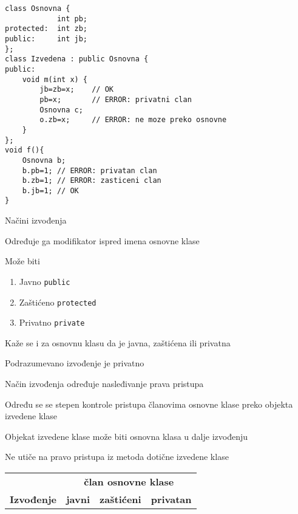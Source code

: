 \documentclass{article}
\newenvironment{xitemize}{%
    
    \itemize
    \larger
}{%
    \enditemize
}
\let\olditemize\itemize
\let\endolditemize\enditemize
\renewenvironment{itemize}{%
    \smaller
    \olditemize
}{%
    \endolditemize
}
\providecommand{\inlinecode}[1]{\texttt{#1}}
\begin{document}
\begin{xitemize}
\begin{itemize}
    \begin{lstlisting}
class Osnovna {
            int pb;
protected:  int zb;
public:     int jb;
};
class Izvedena : public Osnovna {
public:
    void m(int x) {
        jb=zb=x;    // OK
        pb=x;       // ERROR: privatni clan
        Osnovna c;
        o.zb=x;     // ERROR: ne moze preko osnovne
    }
};
void f(){
    Osnovna b;
    b.pb=1; // ERROR: privatan clan
    b.zb=1; // ERROR: zasticeni clan
    b.jb=1; // OK
}
    \end{lstlisting}
\end{itemize}
\item Načini izvođenja
\begin{multicols}{2}

\begin{itemize}
    \item Određuje ga modifikator ispred imena osnovne klase
    \item Može biti
    \begin{enumerate}
        \item Javno \inlinecode{public}
        \item Zaštićeno \inlinecode{protected}
        \item Privatno \inlinecode{private}
    \end{enumerate}
    \item Kaže se i za osnovnu klasu da je javna, zaštićena ili privatna
    \item Podrazumevano izvođenje je privatno
    \item Način izvođenja određuje nasleđivanje prava pristupa
    \item Određu se se stepen kontrole pristupa članovima osnovne klase preko objekta izvedene klase
    \item Objekat izvedene klase može biti osnovna klasa u dalje izvođenju
    \item Ne utiče na pravo pristupa iz metoda dotične izvedene klase
    \begin{table}[ht]
    \begin{tabular}{|l|lll}
    \hline
    \multicolumn{1}{|c|}{}                                     & \multicolumn{3}{c|}{\textbf{član osnovne klase}}                                                                       \\ \cline{2-4} 
    \multicolumn{1}{|c|}{\multirow{-2}{*}{\textbf{Izvođenje}}} & \multicolumn{1}{l|}{\textbf{javni}} & \multicolumn{1}{l|}{\textbf{zaštićeni}} & \multicolumn{1}{l|}{\textbf{privatan}} \\ \hline

\end{tabular}
\end{table}
\end{itemize}
\end{multicols}
\end{xitemize}
\end{document}
